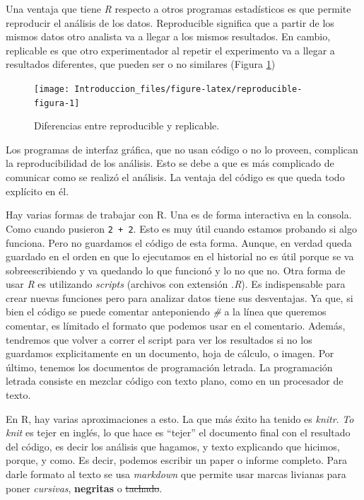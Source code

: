 \documentclass[]{book}
\theoremstyle{definition}
\theoremstyle{definition}
\theoremstyle{definition}
\theoremstyle{remark}
\begin{document}
Una ventaja que tiene \emph{R} respecto a otros programas estadísticos
es que permite reproducir el análisis de los datos. Reproducible
significa que a partir de los mismos datos otro analista va a llegar a
los mismos resultados. En cambio, replicable es que otro experimentador
al repetir el experimento va a llegar a resultados diferentes, que
pueden ser o no similares (Figura \ref{fig:reproducible-figura})

\begin{figure}

{\centering \texttt{[image: Introduccion\_files/figure-latex/reproducible-figura-1]} 

}

\caption{Diferencias entre reproducible y replicable.}\label{fig:reproducible-figura}
\end{figure}

Los programas de interfaz gráfica, que no usan código o no lo proveen,
complican la reproducibilidad de los análisis. Esto se debe a que es más
complicado de comunicar como se realizó el análisis. La ventaja del
código es que queda todo explícito en él.

Hay varias formas de trabajar con R. Una es de forma interactiva en la
consola. Como cuando pusieron \texttt{2\ +\ 2}. Esto es muy útil cuando
estamos probando si algo funciona. Pero no guardamos el código de esta
forma. Aunque, en verdad queda guardado en el orden en que lo ejecutamos
en el historial no es útil porque se va sobreescribiendo y va quedando
lo que funcionó y lo no que no. Otra forma de usar \emph{R} es
utilizando \emph{scripts} (archivos con extensión \emph{.R}). Es
indispensable para crear nuevas funciones pero para analizar datos tiene
sus desventajas. Ya que, si bien el código se puede comentar
anteponiendo \emph{\#} a la línea que queremos comentar, es límitado el
formato que podemos usar en el comentario. Además, tendremos que volver
a correr el script para ver los resultados si no los guardamos
explicitamente en un documento, hoja de cálculo, o imagen. Por último,
tenemos los documentos de programación letrada. La programación letrada
consiste en mezclar código con texto plano, como en un procesador de
texto.

En R, hay varias aproximaciones a esto. La que más éxito ha tenido es
\emph{knitr}. \emph{To knit} es tejer en inglés, lo que hace es
``tejer'' el documento final con el resultado del código, es decir los
análisis que hagamos, y texto explicando que hicimos, porque, y como. Es
decir, podemos escribir un paper o informe completo. Para darle formato
al texto se usa \emph{markdown} que permite usar marcas livianas para
poner \emph{cursivas}, \textbf{negritas} o \sout{tachado}.
\end{document}
